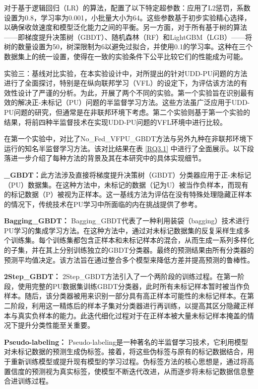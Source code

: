 对于基于逻辑回归（LR）的算法，配置了以下特定超参数：应用了L2惩罚，系数设置为0.8，学习率为0.001，小批量大小为64。这些参数基于初步实验精心选择，以确保收敛速度和模型泛化能力之间的平衡。另一方面，对于所有基于树的算法——即梯度提升决策树（GBDT）、随机森林（RF）和LightGBM（LGB）——将树的数量设置为50，树深限制为6以避免过拟合，并使用0.1的学习率。这种在三个数据集上的统一设置，使得在一致的实验条件下公平比较它们的性能成为可能。

实验三：基线对比实验，在本实验设计中，对所提出的针对UDD-PU问题的方法进行了全面探讨，特别是在纵向联邦学习（VFL）的设定下，为评估该方法的有效性设计了严谨的分析。为此，开展了两个不同的实验。第一个实验旨在识别最有效的解决正-未标记（PU）问题的半监督学习方法。这些方法虽广泛应用于UDD-PU问题的研究，但通常是在非联邦环境下考虑。第二个实验则基于第一个实验的结果，将前四种半监督技术在实现UDD-PU问题的VFL环境中进行比较。

在第一个实验中，对比了No\_Fed\_VFPU\_GBDT方法与另外九种在非联邦环境下运行的知名半监督学习方法。该对比结果在表 \ref{RQ3.1} 中进行了全面展示。以下段落进一步介绍了每种方法的背景及其在本研究中的具体实现细节。

\textbf{\_GBDT：}此方法涉及直接将梯度提升决策树（GBDT）分类器应用于正-未标记（PU）数据集。在这种方法中，未标记的数据（记为U）被当作负样本，而现有的标记数据（P）被视为正样本。这一基线方法为评估在没有特殊处理隐藏正样本的情况下，传统技术在PU学习中所面临的内在挑战提供了参考。

\textbf{Bagging\_GBDT：} Bagging\_GBDT代表了一种利用装袋（bagging）技术进行PU学习的集成学习方法。在这种方法中，通过对未标记数据集的反复采样生成多个训练集。每个训练集都包含正样本和未标记样本的混合，从而生成一系列多样化的子集，并在其上分别训练独立的GBDT分类器。最终的预测结果由所有分类器的预测平均值决定。该方法旨在通过整合多个模型来降低方差并提高预测的鲁棒性。

\textbf{2Step\_GBDT：} 2Step\_GBDT方法引入了一个两阶段的训练过程。在第一阶段，使用完整的PU数据集训练GBDT分类器，此时所有未标记样本暂时被当作负样本。随后，该分类器被用来识别一部分具有高正样本可能性的未标记样本。在第二阶段，利用这一精炼后的样本子集对分类器进行再训练，以提高其区分隐藏正样本与真实负样本的能力。此迭代细化过程对于在正样本被大量未标记样本掩盖的情况下提升分类性能至关重要。

\textbf{Pseudo-labeling：} Pseudo-labeling是一种著名的半监督学习技术，它利用模型对未标记数据的预测生成伪标签。接着，将这些伪标签与原有的标记数据结合，用于重新训练模型或提升现有模型的学习过程。伪标签方法的核心思想是，通过将高置信度的预测视为真实标签，使模型不断迭代改进，从而逐步将未标记数据信息整合进训练过程。

